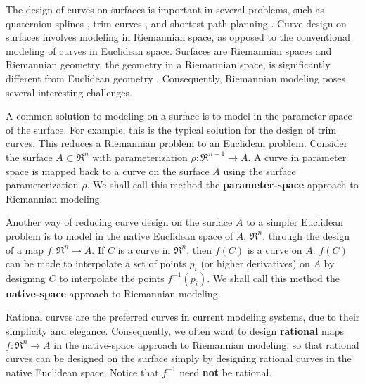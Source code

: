 The design of curves on surfaces is important in several problems,
such as quaternion splines \cite{barr92,jj95},
trim curves \cite{hoschek89}, and
shortest path planning \cite{lozanoperez83,kim88}.
Curve design on surfaces involves modeling in Riemannian space,
as opposed to the conventional modeling of curves in Euclidean space.
Surfaces are Riemannian spaces and Riemannian geometry,
the geometry in a Riemannian space, is significantly different from
Euclidean geometry \cite{kreyszig59}.
Consequently, Riemannian modeling poses several interesting challenges.

A common solution to modeling on a surface is to model in the parameter
space of the surface.
For example, this is the typical solution for the design of trim curves.
This reduces a Riemannian problem to an Euclidean problem.
Consider the surface $A \subset \Re^n$ with parameterization
$\rho:\Re^{n-1} \rightarrow A$.
A curve in parameter space is mapped back to a curve on the 
surface $A$ using the surface parameterization $\rho$.
We shall call this method the {\bf parameter-space} approach to Riemannian
modeling.

Another way of reducing curve design on the surface $A$
to a simpler Euclidean problem is to model in the native Euclidean space
of $A$, $\Re^n$, through the design of a map $f: \Re^n \rightarrow A$.
If $C$ is a curve in $\Re^{n}$, then $f(C)$ is a curve on $A$.
$f(C)$ can be made to interpolate a set of points $p_i$ 
(or higher derivatives)
on $A$ by designing $C$ to interpolate the points $f^{-1}(p_i)$.
We shall call this method the {\bf native-space} approach to Riemannian 
modeling.

Rational curves are the preferred curves in current modeling systems,
due to their simplicity and elegance.
Consequently, we often want to design {\bf rational} maps 
$f: \Re^n \rightarrow A$ in the native-space approach to Riemannian modeling,
so that rational curves can be designed on the surface simply
by designing rational curves in the native Euclidean space.
Notice that $f^{-1}$ need {\bf not} be rational.

